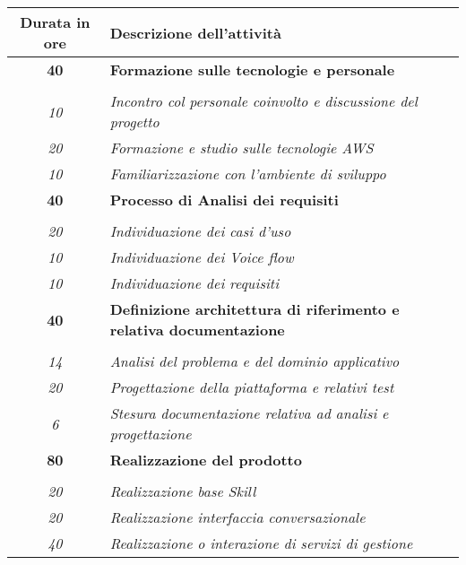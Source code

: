 

\begin{tabularx}{\textwidth}{|c|X|}
	\hline
	\textbf{Durata in ore} & \textbf{Descrizione dell'attività} \\\hline

	\textbf{40} & \textbf{Formazione sulle tecnologie e personale} \\	\hdashline 
	\multirow{3}{0cm}\\ 
	\textit{10} & 
	\textit{Incontro col personale coinvolto e discussione del progetto} \\
	\textit{20} & 
	\textit{Formazione e studio sulle tecnologie AWS} \\
	\textit{10} & 
	\textit{Familiarizzazione con l'ambiente di sviluppo } \\
	\hline   
	
	\textbf{40} & \textbf{Processo di Analisi dei requisiti} \\ \hdashline 
	\multirow{3}{0cm}\\ 
	\textit{20} & 
	\textit{Individuazione dei casi d'uso} \\
	\textit{10} & 
	\textit{Individuazione dei Voice flow} \\
	\textit{10} & 
	\textit{Individuazione dei requisiti} \\
	\hline
	
    \textbf{40} & \textbf{Definizione architettura di riferimento e relativa documentazione} \\ \hdashline 
    \multirow{3}{0cm}\\ 
    \textit{14} & 
    \textit{Analisi del problema e del dominio applicativo} \\
    \textit{20} & 
    \textit{Progettazione della piattaforma e relativi test} \\
    \textit{6} & 
    \textit{Stesura documentazione relativa ad analisi e progettazione} \\
    \hline
    
   \textbf{80} & \textbf{Realizzazione del prodotto} \\	\hdashline
   \multirow{3}{0cm}\\ 
   \textit{20} & 
   \textit{Realizzazione base Skill} \\
   \textit{20} & 
   \textit{Realizzazione interfaccia conversazionale} \\
   \textit{40} & 
   \textit{Realizzazione o interazione di servizi di gestione} \\
   \hline
    

\end{tabularx}
